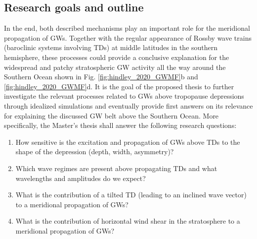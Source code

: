 \subsection{Research goals and outline}
\label{sec:goals}
%
In the end, both described mechanisms play an important role for the meridional propagation of GWs. Together with the regular appearance of Rossby wave trains (baroclinic systems involving TDs) at middle latitudes in the southern hemisphere, these processes could provide a conclusive explanation for the widespread and patchy stratospheric GW activity all the way around the Southern Ocean shown in Fig. \ref{fig:hindley_2020_GWMF}b and \ref{fig:hindley_2020_GWMF}d. It is the goal of the proposed thesis to further investigate the relevant processes related to GWs above tropopause depressions through idealized simulations and eventually provide first answers on its relevance for explaining the discussed GW belt above the Southern Ocean. More specifically, the Master's thesis shall answer the following research questions:
%
\begin{enumerate}
    \item How sensitive is the excitation and propagation of GWs above TDs to the shape of the depression (depth, width, asymmetry)?
    \item Which wave regimes are present above propagating TDs and what wavelengths and amplitudes do we expect?
    \item What is the contribution of a tilted TD (leading to an inclined wave vector) to a meridional propagation of GWs?
    \item What is the contribution of horizontal wind shear in the stratosphere to a meridional propagation of GWs?
\end{enumerate}





